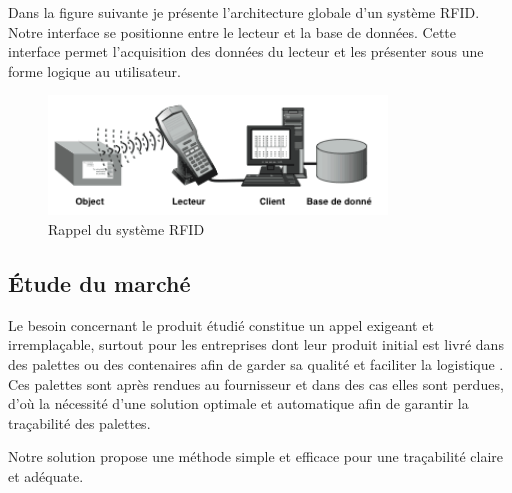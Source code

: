 \documentclass[11pt, a4paper, twoside]{book}
\begin{document}
Dans la figure suivante je présente l'architecture globale d'un système RFID. Notre interface se positionne entre le lecteur et la base de données. Cette interface permet l'acquisition des données du lecteur et les présenter sous une forme logique au utilisateur.

\begin{figure}[H]
\centering
\includegraphics[width=9cm]{systemx}
\caption{Rappel du système RFID}
\end{figure}

\subsection{Étude du marché}
Le besoin concernant le produit étudié constitue un appel exigeant et irremplaçable, surtout pour les entreprises dont leur produit initial est livré dans des palettes ou des contenaires afin de garder sa qualité et faciliter la logistique . Ces palettes sont après rendues au fournisseur et dans des cas elles sont perdues, d'où la nécessité d'une solution optimale et automatique afin de garantir la traçabilité des palettes.

Notre solution propose une méthode simple et efficace pour une traçabilité claire et adéquate.
\end{document}
